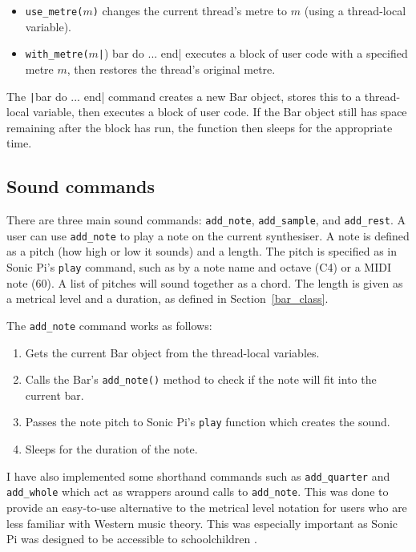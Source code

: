 \documentclass[12pt,twoside,openright]{report}
\begin{document}
\begin{itemize}
	\item \verb'use_metre('$m$\verb')' changes the current thread's metre to $m$ (using a thread-local variable).
	\item \verb'with_metre('$m$\texttt|) bar do ... end| executes a block of user code with a specified metre $m$, then restores the thread's original metre.
\end{itemize}

The \texttt|bar do ... end| command creates a new Bar object, stores this to a
thread-local variable, then executes a block of user code. If the Bar object
still has space remaining after the block has run, the function then sleeps for
the appropriate time.


\subsection{Sound commands} \label{sound_commands}

There are three main sound commands: \verb'add_note', \verb'add_sample', and \verb'add_rest'. A
user can use \verb'add_note' to play a note on the current synthesiser. A note is
defined as a pitch (how high or low it sounds) and a length. The pitch is
specified as in Sonic Pi's \verb'play' command, such as by a note name and octave (C4)
or a MIDI note (60). A list of pitches will sound together as a chord. The
length is given as a metrical level and a duration, as defined in Section~\ref{bar_class}.

The \verb'add_note' command works as follows:
\begin{enumerate}
    \item Gets the current Bar object from the thread-local variables.
    \item Calls the Bar's \verb'add_note()' method to check if the note will fit into the current bar.
    \item Passes the note pitch to Sonic Pi's \verb'play' function which creates the sound.
    \item Sleeps for the duration of the note.
\end{enumerate}

I have also implemented some shorthand commands such as \verb'add_quarter' and
\verb'add_whole' which act as wrappers around calls to \verb'add_note'. This was done to
provide an easy-to-use alternative to the metrical level notation for users who
are less familiar with Western music theory. This was especially important as
Sonic Pi was designed to be accessible to schoolchildren \cite{aaron2013}.
\end{document}
